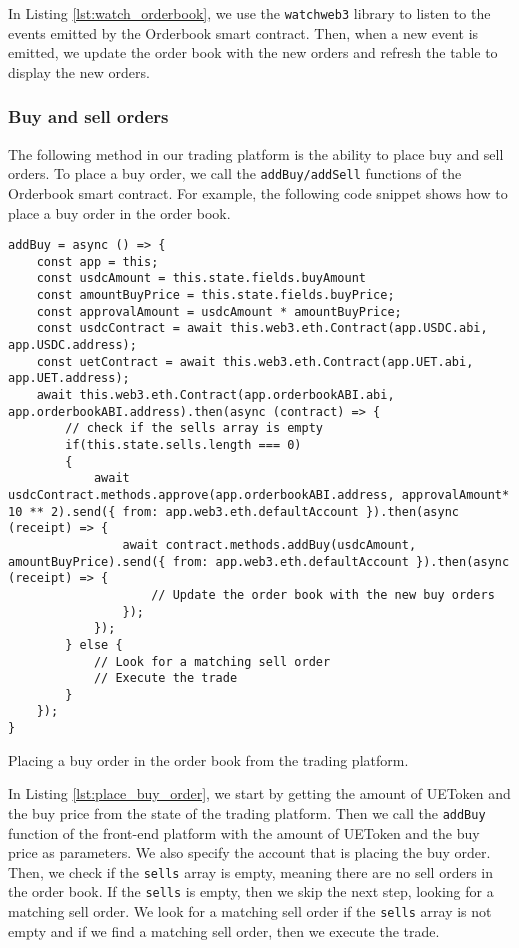 In Listing \ref{lst:watch_orderbook}, we use the \texttt{watchweb3} library to listen to the events emitted by the Orderbook smart contract. Then, when a new event is
emitted, we update the order book with the new orders and refresh the table to display the new orders.


\subsubsection{Buy and sell orders}


The following method in our trading platform is the ability to place buy and sell orders. To place a buy order, we call the \texttt{addBuy/addSell} functions of the Orderbook
smart contract. For example, the following code snippet shows how to place a buy order in the order book.

\begin{listing}[H]
    \begin{verbatim}
addBuy = async () => {
    const app = this;
    const usdcAmount = this.state.fields.buyAmount
    const amountBuyPrice = this.state.fields.buyPrice;
    const approvalAmount = usdcAmount * amountBuyPrice;
    const usdcContract = await this.web3.eth.Contract(app.USDC.abi, app.USDC.address);
    const uetContract = await this.web3.eth.Contract(app.UET.abi, app.UET.address);
    await this.web3.eth.Contract(app.orderbookABI.abi, app.orderbookABI.address).then(async (contract) => {
        // check if the sells array is empty
        if(this.state.sells.length === 0)
        {
            await usdcContract.methods.approve(app.orderbookABI.address, approvalAmount* 10 ** 2).send({ from: app.web3.eth.defaultAccount }).then(async (receipt) => {
                await contract.methods.addBuy(usdcAmount, amountBuyPrice).send({ from: app.web3.eth.defaultAccount }).then(async (receipt) => {
                    // Update the order book with the new buy orders
                });
            });
        } else {
            // Look for a matching sell order
            // Execute the trade
        }
    });
}
    \end{verbatim}
    \caption{Placing a buy order in the order book from the trading platform.}
    \label{lst:place_buy_order}
\end{listing}

In Listing \ref{lst:place_buy_order}, we start by getting the amount of UEToken and the buy price from the state of the trading platform. Then we call the
\texttt{addBuy} function of the front-end platform with the amount of UEToken and the buy price as parameters. We also specify the account that is
placing the buy order. Then, we check if the \texttt{sells} array is empty, meaning there are no sell orders in the order book. If the \texttt{sells}
is empty, then we skip the next step, looking for a matching sell order. We look for a matching sell order if the \texttt{sells} array is not empty and if we find a matching sell order, then we execute the trade.



